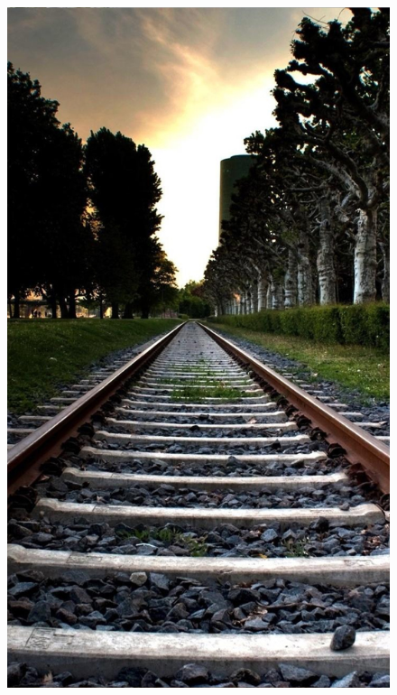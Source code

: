 \begin{figure}[ht]
    \centering
    \begin{minipage}{.24\textwidth}
        \includegraphics[width=.9\textwidth]{imgs/vias.jpg}
    \end{minipage}
    \begin{minipage}{.24\textwidth}

\end{minipage}
\end{figure}
